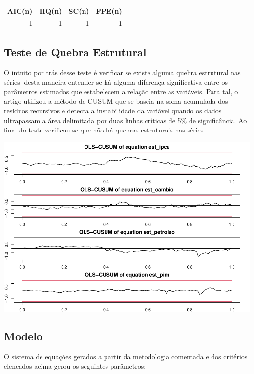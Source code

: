 \documentclass[12pt]{article}
\begin{document}
\begin{longtable}[]{@{}rrrr@{}}
\toprule
AIC(n) & HQ(n) & SC(n) & FPE(n) \\
\midrule
\endhead
1 & 1 & 1 & 1 \\
\bottomrule
\end{longtable}

\hypertarget{teste-de-quebra-estrutural}{%
\subsection{Teste de Quebra
Estrutural}\label{teste-de-quebra-estrutural}}

O intuito por trás desse teste é verificar se existe alguma quebra
estrutural nas séries, desta maneira entender se há alguma diferença
significativa entre os parâmetros estimados que estabelecem a relação
entre as variáveis. Para tal, o artigo utilizou a método de CUSUM que se
baseia na soma acumulada dos resíduos recursivos e detecta a
instabilidade da variável quando os dados ultrapassam a área delimitada
por duas linhas críticas de 5\% de significância. Ao final do teste
verificou-se que não há quebras estruturais nas séries.

\includegraphics{artigo_files/figure-latex/unnamed-chunk-4-1.pdf}

\hypertarget{modelo}{%
\subsection{Modelo}\label{modelo}}

O sistema de equações gerados a partir da metodologia comentada e dos
critérios elencados acima gerou os seguintes parâmetros:
\end{document}
